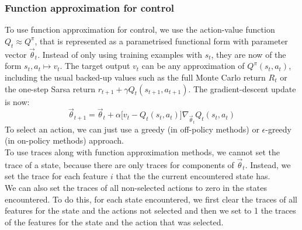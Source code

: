 \documentclass[a4paper, 11pt]{article}
\begin{document}
\subsubsection{Function approximation for control}
\label{subs:rl_facontrol}
To use function approximation for control, we use the action-value function $Q_t \approx Q^{\pi}$, that is represented as a parametrised functional form with parameter vector $\overrightarrow{\theta}_t$. Instead of only using training examples with $s_t$, they are now of the form $s_t, a_t \mapsto v_t$. The target output $v_t$ can be any approximation of $Q^{\pi}(s_t,a_t)$, including the usual backed-up values such as the full Monte Carlo return $R_t$ or the one-step Sarsa return $r_{t+1} + \gamma Q_t(s_{t+1}, a_{t+1})$. The gradient-descent update is now:
\begin{equation}
\overrightarrow{\theta}_{t+1} = \overrightarrow{\theta}_t + \alpha \big[ v_t - Q_t(s_t,a_t) \big] \nabla_{\overrightarrow{\theta}_t} Q_t(s_t,a_t)
\end{equation}
To select an action, we can just use a greedy (in off-policy methods) or $\epsilon$-greedy (in on-policy methods) approach.\\
To use traces along with function approximation methods, we cannot set the trace of a state, because there are only traces for components of $\overrightarrow{\theta}_t$. Instead, we set the trace for each feature $i$ that the the current encountered state has.\\
We can also set the traces of all non-selected actions to zero in the states encountered. To do this, for each state encountered, we first clear the traces of all features for the state and the actions not selected and then we set to 1 the traces of the features for the state and the action that was selected.\\

\end{document}
